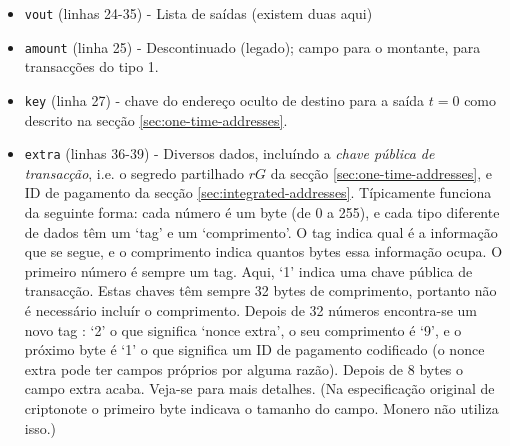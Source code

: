 \begin{appendices}
\begin{itemize}
	\item {\tt vout} (linhas 24-35) - Lista de saídas (existem duas aqui)
	\item {\tt amount} (linha 25) - Descontinuado (legado); campo para o montante, para transacções do tipo 1.
	\item {\tt key} (linha 27) - chave do endereço oculto de destino para a saída $t = 0$ como descrito na secção \ref{sec:one-time-addresses}.
	\item {\tt extra} (linhas 36-39) - Diversos dados,  incluíndo a {\em chave pública de transacção}, i.e. o segredo partilhado $r G$ da secção \ref{sec:one-time-addresses}, e ID de pagamento da secção \ref{sec:integrated-addresses}. Típicamente funciona da seguinte forma: cada número é um byte (de 0 a 255), e cada tipo diferente de dados têm um `tag' e um `comprimento'. O tag indica qual é a informação que se segue, e o comprimento indica quantos bytes essa informação ocupa. O primeiro número é sempre um tag. Aqui, `1' indica uma chave pública de transacção. Estas chaves têm sempre 32 bytes de comprimento, portanto não é necessário incluír o comprimento. Depois de 32 números encontra-se um novo tag : `2' o que significa `nonce extra', o seu comprimento é `9', e o próximo byte é `1' o que significa um ID de pagamento codificado (o nonce extra pode ter campos próprios por alguma razão). Depois de 8 bytes o campo extra acaba. Veja-se \cite{extra-field-stackexchange} para mais detalhes. (Na especificação original de criptonote o primeiro byte indicava o tamanho do campo. Monero não utiliza isso.) \cite{tx-extra-field}  

\end{itemize}
\end{appendices}
